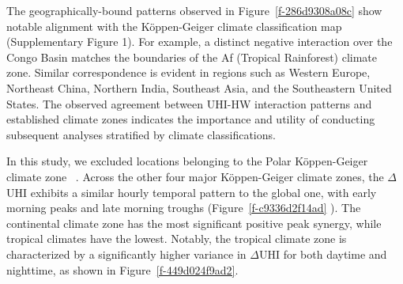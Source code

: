 \bgroup
{}
\begin{figure*}[!htbp]
\centering \makeatletter{}
\makeatother 
\caption{{\textbf{Nighttime \ensuremath{\Delta }UHI is stronger than that of Daytime.} Geographical distributions of \ensuremath{\Delta }UHI during daytime (a) and nighttime (b). }}
\label{f-286d9308a08c}
\end{figure*}
\egroup

\bgroup
{}
\begin{figure*}[!htbp]
\centering \makeatletter{}
\makeatother 
\caption{{K{\"{o}}ppen{\textendash}Geiger climate map 1991{\textendash}2020\unskip~\protect\cite{2755510:33598889}}}
\label{f-3967a5eb5d38}
\end{figure*}
\egroup
The geographically-bound patterns observed in Figure~\ref{f-286d9308a08c}  show notable alignment with the K{\"{o}}ppen-Geiger climate classification map\unskip~\cite{2755510:33598889}  (Supplementary Figure 1). For example, a distinct negative interaction over the Congo Basin matches the boundaries of the Af (Tropical Rainforest) climate zone. Similar correspondence is evident in regions such as Western Europe, Northeast China, Northern India, Southeast Asia, and the Southeastern United States. The observed agreement between UHI-HW interaction patterns and established climate zones indicates the importance and utility of conducting subsequent analyses stratified by climate classifications.

In this study, we excluded locations belonging to the Polar K{\"{o}}ppen-Geiger climate zone\unskip~\cite{2755510:33598889} . Across the other four major K{\"{o}}ppen-Geiger climate zones, the \ensuremath{\Delta }UHI exhibits a similar hourly temporal pattern to the global one, with early morning peaks and late morning troughs (Figure~\ref{f-c9336d2f14ad} ). The continental climate zone has the most significant positive peak synergy, while tropical climates have the lowest. Notably, the tropical climate zone is characterized by a significantly higher variance in \ensuremath{\Delta }UHI for both daytime and nighttime, as shown in Figure~\ref{f-449d024f9ad2}.


